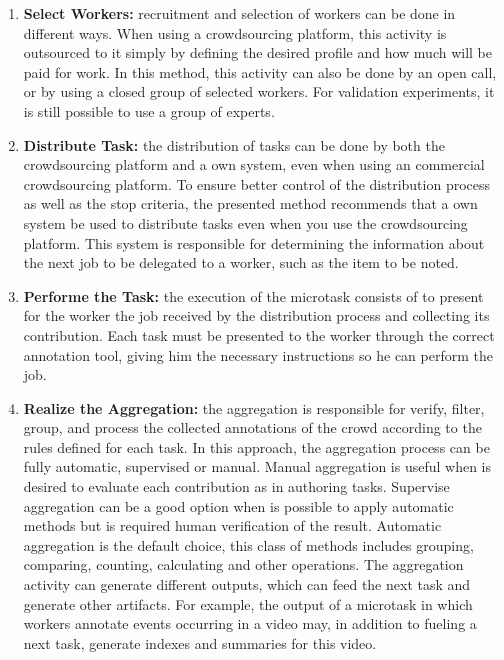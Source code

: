 \begin{enumerate}
\item  \textbf{Select Workers:} recruitment and selection of workers can be done in different ways. When using a crowdsourcing platform, this activity is outsourced to it simply by defining the desired profile and how much will be paid for work. In this method, this activity can also be done by an open call, or by using a closed group of selected workers. For validation experiments, it is still possible to use a group of experts.

\item  \textbf{Distribute Task:} the distribution of tasks can be done by both the crowdsourcing platform and a own system, even when using an commercial crowdsourcing platform. To ensure better control of the distribution process as well as the stop criteria, the presented method recommends that a own system be used to distribute tasks even when you use the crowdsourcing platform. This system is responsible for determining the information about the next job to be delegated to a worker, such as the item to be noted.

\item  \textbf{Performe the Task:} the execution of the microtask consists of to present for the worker the job received by the distribution process and collecting its contribution. Each task must be presented to the worker through the correct annotation tool, giving him the necessary instructions so he can perform the job. %

\item  \textbf{Realize the Aggregation:} the aggregation is responsible for verify, filter, group, and process the collected annotations of the crowd according to the rules defined for each task. In this approach, the aggregation process can be fully automatic, supervised or manual. Manual aggregation is useful when is desired to evaluate each contribution as in authoring tasks. Supervise aggregation can be a good option when is possible to apply automatic methods but is required human verification of the result. Automatic aggregation is the default choice, this class of methods includes grouping, comparing, counting, calculating and other operations. The aggregation activity can generate different outputs, which can feed the next task and generate other artifacts. For example, the output of a microtask in which workers annotate events occurring in a video may, in addition to fueling a next task, generate indexes and summaries for this video.

\end{enumerate}

